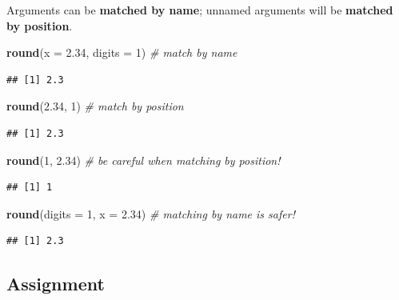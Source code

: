 \documentclass[]{book}
\newenvironment{Shaded}{\begin{snugshade}}{\end{snugshade}}
\newcommand{\CommentTok}[1]{\textcolor[rgb]{0.56,0.35,0.01}{\textit{#1}}}
\newcommand{\DataTypeTok}[1]{\textcolor[rgb]{0.13,0.29,0.53}{#1}}
\newcommand{\DecValTok}[1]{\textcolor[rgb]{0.00,0.00,0.81}{#1}}
\newcommand{\FloatTok}[1]{\textcolor[rgb]{0.00,0.00,0.81}{#1}}
\newcommand{\KeywordTok}[1]{\textcolor[rgb]{0.13,0.29,0.53}{\textbf{#1}}}
\newcommand{\NormalTok}[1]{#1}
\begin{document}
Arguments can be \textbf{matched by name}; unnamed arguments will be \textbf{matched by position}.

\begin{Shaded}
\begin{Highlighting}[]
\KeywordTok{round}\NormalTok{(}\DataTypeTok{x =} \FloatTok{2.34}\NormalTok{, }\DataTypeTok{digits =} \DecValTok{1}\NormalTok{) }\CommentTok{# match by name}
\end{Highlighting}
\end{Shaded}

\begin{verbatim}
## [1] 2.3
\end{verbatim}

\begin{Shaded}
\begin{Highlighting}[]
\KeywordTok{round}\NormalTok{(}\FloatTok{2.34}\NormalTok{, }\DecValTok{1}\NormalTok{) }\CommentTok{# match by position}
\end{Highlighting}
\end{Shaded}

\begin{verbatim}
## [1] 2.3
\end{verbatim}

\begin{Shaded}
\begin{Highlighting}[]
\KeywordTok{round}\NormalTok{(}\DecValTok{1}\NormalTok{, }\FloatTok{2.34}\NormalTok{) }\CommentTok{# be careful when matching by position!}
\end{Highlighting}
\end{Shaded}

\begin{verbatim}
## [1] 1
\end{verbatim}

\begin{Shaded}
\begin{Highlighting}[]
\KeywordTok{round}\NormalTok{(}\DataTypeTok{digits =} \DecValTok{1}\NormalTok{, }\DataTypeTok{x =} \FloatTok{2.34}\NormalTok{) }\CommentTok{# matching by name is safer!}
\end{Highlighting}
\end{Shaded}

\begin{verbatim}
## [1] 2.3
\end{verbatim}

\hypertarget{assignment}{%
\subsection{Assignment}\label{assignment}}
\end{document}
